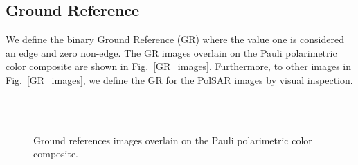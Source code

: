 \documentclass[remotesensing,article,submit,pdftex,moreauthors]{Definitions/mdpi}
\begin{document}
\subsection{Ground Reference}
We define the binary Ground Reference (GR) where the value one is considered an edge and zero non-edge. The GR images overlain on the Pauli polarimetric color composite are shown in Fig.~\eqref{GR_images}. Furthermore, to other images in Fig.~\eqref{GR_images}, we define the GR for the PolSAR images by visual inspection.
\begin{figure}[ht!]
    \centering
    \\
     \\
    \caption{Ground references images overlain on the Pauli polarimetric color composite.}
     \label{GR_images} 
\end{figure}
\end{document}

